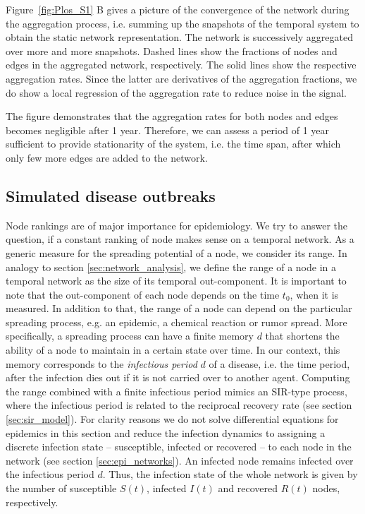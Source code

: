 Figure~\ref{fig:Plos_S1} B gives a picture of the convergence of the network during the aggregation process, i.e. summing up the snapshots of the temporal system to obtain the static network representation.
The network is successively aggregated over more and more snapshots.
Dashed lines show the fractions of nodes and edges in the aggregated network, respectively.
The solid lines show the respective aggregation rates.
Since the latter are derivatives of the aggregation fractions, we do show a local regression of the aggregation rate to reduce noise in the signal.

The figure demonstrates that the aggregation rates for both nodes and edges becomes negligible after 1 year.
Therefore, we can assess a period of 1 year sufficient to provide stationarity of the system, i.e. the time span, after which only few more edges are added to the network.

\subsection{Simulated disease outbreaks}
Node rankings are of major importance for epidemiology.
We try to answer the question, if a constant ranking of node makes sense on a temporal network.
As a generic measure for the spreading potential of a node, we consider its range.
In analogy to section \ref{sec:network_analysis}, we define the range of a node in a temporal network as the size of its temporal out-component.
It is important to note that the out-component of each node depends on the time $t_0$, when it is measured.
In addition to that, the range of a node can depend on the particular spreading process, e.g. an epidemic, a chemical reaction or rumor spread.
More specifically, a spreading process can have a finite memory $d$ that shortens the ability of a node to maintain in a certain state over time.
In our context, this memory corresponds to the \emph{infectious period} $d$ of a disease, i.e. the time period, after the infection dies out if it is not carried over to another agent.
Computing the range combined with a finite infectious period mimics an SIR-type process, where the infectious period is related to the reciprocal recovery rate (see section \ref{sec:sir_model}).
For clarity reasons we do not solve differential equations for epidemics in this section and reduce the infection dynamics to assigning a discrete infection state -- susceptible, infected or recovered -- to each node in the network (see section \ref{sec:epi_networks}).
An infected node remains infected over the infectious period $d$.
Thus, the infection state of the whole network is given by the number of susceptible $S(t)$, infected $I(t)$ and recovered $R(t)$ nodes, respectively.

